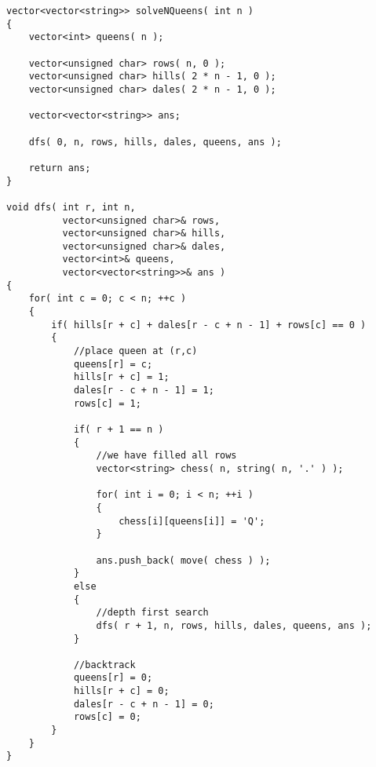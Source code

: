 \setcounter{lstlisting}{0}
\begin{lstlisting}[style=customc, caption={Backtrack}]
vector<vector<string>> solveNQueens( int n )
{
    vector<int> queens( n );

    vector<unsigned char> rows( n, 0 );
    vector<unsigned char> hills( 2 * n - 1, 0 );
    vector<unsigned char> dales( 2 * n - 1, 0 );

    vector<vector<string>> ans;

    dfs( 0, n, rows, hills, dales, queens, ans );

    return ans;
}

void dfs( int r, int n,
          vector<unsigned char>& rows,
          vector<unsigned char>& hills,
          vector<unsigned char>& dales,
          vector<int>& queens,
          vector<vector<string>>& ans )
{
    for( int c = 0; c < n; ++c )
    {
        if( hills[r + c] + dales[r - c + n - 1] + rows[c] == 0 )
        {
            //place queen at (r,c)
            queens[r] = c;
            hills[r + c] = 1;
            dales[r - c + n - 1] = 1;
            rows[c] = 1;

            if( r + 1 == n )
            {
                //we have filled all rows
                vector<string> chess( n, string( n, '.' ) );

                for( int i = 0; i < n; ++i )
                {
                    chess[i][queens[i]] = 'Q';
                }

                ans.push_back( move( chess ) );
            }
            else
            {
                //depth first search
                dfs( r + 1, n, rows, hills, dales, queens, ans );
            }

            //backtrack
            queens[r] = 0;
            hills[r + c] = 0;
            dales[r - c + n - 1] = 0;
            rows[c] = 0;
        }
    }
}
\end{lstlisting}